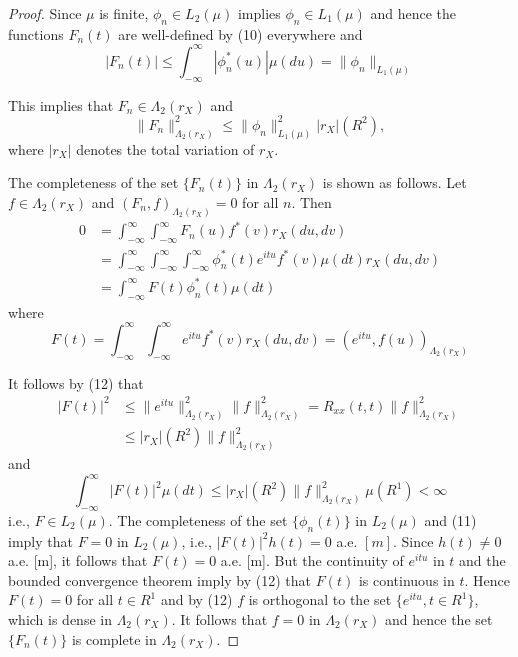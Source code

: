 \documentclass{article}
\begin{document}
\begin{proof}
Since $\mu$ is finite, $\phi_{n} \in L_{2}(\mu)$ implies $\phi_{n} \in L_{1}(\mu)$ and hence the functions $F_{n}(t)$ are well-defined by (10) everywhere and
\[
|F_{n}(t)| \leqslant \int_{-\infty}^{\infty}|\phi_{n}^{*}(u)| \mu(d u)=\|\phi_{n}\|_{L_{1}(\mu)}
\]

This implies that $F_{n} \in \Lambda_{2}(r_{X})$ and
\[
\|F_{n}\|_{\Lambda_{2}(r_{X})}^{2} \leqslant\|\phi_{n}\|_{L_{1}(\mu)}^{2}|r_{X}|(R^{2}),
\]
where $|r_{X}|$ denotes the total variation of $r_{X}$.

The completeness of the set $\{F_{n}(t)\}$ in $\Lambda_{2}(r_{X})$ is shown as follows. Let $f \in \Lambda_{2}(r_{X})$ and $(F_{n}, f)_{\Lambda_{2}(r_{X})}=0$ for all $n$. Then
\[
\begin{aligned}
0 &= \int_{-\infty}^{\infty} \int_{-\infty}^{\infty} F_{n}(u) f^{*}(v) r_{X}(d u, d v) \\
&= \int_{-\infty}^{\infty} \int_{-\infty}^{\infty} \int_{-\infty}^{\infty} \phi_{n}^{*}(t) e^{i t u} f^{*}(v) \mu(d t) r_{X}(d u, d v) \\
&= \int_{-\infty}^{\infty} F(t) \phi_{n}^{*}(t) \mu(d t)
\end{aligned}
\]
where
\[
F(t)=\int_{-\infty}^{\infty} \int_{-\infty}^{\infty} e^{i t u} f^{*}(v) r_{X}(d u, d v)=(e^{i t u}, f(u))_{\Lambda_{2}(r_{X})}
\]

It follows by (12) that
\[
\begin{aligned}
|F(t)|^{2} &\leqslant \|e^{i t u}\|_{\Lambda_{2}(r_{X})}^{2}\|f\|_{\Lambda_{2}(r_{X})}^{2}=R_{x x}(t, t)\|f\|_{\Lambda_{2}(r_{X})}^{2} \\
&\leqslant |r_{X}|(R^{2})\|f\|_{\Lambda_{2}(r_{X})}^{2}
\end{aligned}
\]
and
\[
\int_{-\infty}^{\infty}|F(t)|^{2} \mu(d t) \leqslant |r_{X}|(R^{2})\|f\|_{\Lambda_{2}(r_{X})}^{2} \mu(R^{1})<\infty
\]
i.e., $F \in L_{2}(\mu)$. The completeness of the set $\{\phi_{n}(t)\}$ in $L_{2}(\mu)$ and (11) imply that $F=0$ in $L_{2}(\mu)$, i.e., $|F(t)|^{2} h(t)=0$ a.e. $[m]$. Since $h(t) \neq 0$ a.e. [m], it follows that $F(t)=0$ a.e. [m]. But the continuity of $e^{i t u}$ in $t$ and the bounded convergence theorem imply by (12) that $F(t)$ is continuous in $t$. Hence $F(t)=0$ for all $t \in R^{1}$ and by (12) $f$ is orthogonal to the set $\{e^{i t u}, t \in R^{1}\}$, which is dense in $\Lambda_{2}(r_{X})$. It follows that $f=0$ in $\Lambda_{2}(r_{X})$ and hence the set $\{F_{n}(t)\}$ is complete in $\Lambda_{2}(r_{X})$.
\end{proof}
\end{document}
